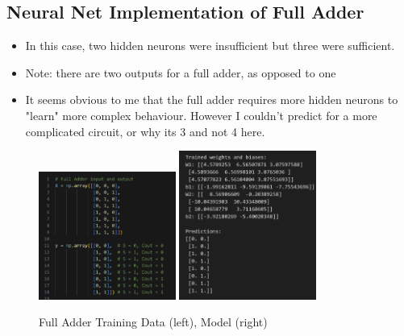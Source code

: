 \documentclass[12pt,a4paper]{article}
\begin{document}
\subsection{Neural Net Implementation of Full Adder}
\begin{itemize}
\item In this case, two hidden neurons were insufficient but three were sufficient. 
\item Note: there are two outputs for a full adder, as opposed to one
\item It seems obvious to me that the full adder requires more hidden neurons to "learn" more complex behaviour. However I couldn't predict for a more complicated circuit, or why its 3 and not 4 here.
\end{itemize}
\begin{figure}[h!]
    \centering
\includegraphics[width=0.4\textwidth]{full_in} 
    \includegraphics[width=0.4\textwidth]{full} 
    \caption{Full Adder Training Data (left), Model (right)}
    \label{fig:example}
\end{figure}
\pagebreak
\end{document}
